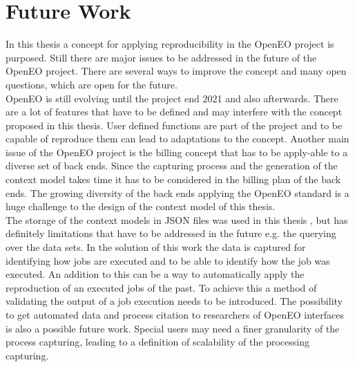 \documentclass[draft,final]{vutinfth} %
\begin{document}
\section{Future Work}
In this thesis a concept for applying reproducibility in the OpenEO project is purposed. Still there are major issues to be addressed in the future of the OpenEO project. There are several ways to improve the concept and many open questions, which are open for the future. \\
OpenEO is still evolving until the project end 2021 and also afterwards. There are a lot of features that have to be defined and may interfere with the concept proposed in this thesis. User defined functions are part of the project and to be capable of reproduce them can lead to adaptations to the concept. Another main issue of the OpenEO project is the billing concept that has to be apply-able to a diverse set of back ends. Since the capturing process and the generation of the context model takes time it has to be considered in the billing plan of the back ends. The growing diversity of the back ends applying the OpenEO standard is a huge challenge to the design of the context model of this thesis.\\
The storage of the context models in JSON files was used in this thesis , but has definitely limitations that have to be addressed in the future e.g. the querying over the data sets. 
In the solution of this work the data is captured for identifying how jobs are executed and to be able to identify how the job was executed. An addition to this can be a way to automatically apply the reproduction of an executed jobs of the past. To achieve this a method of validating the output of a job execution needs to be introduced. The possibility to get automated data and process citation to researchers of OpenEO interfaces is also a possible future work. Special users may need a finer granularity of the process capturing, leading to a definition of scalability of the processing capturing.      


\backmatter

\listoffigures %

\cleardoublepage %
\listoftables %


\printindex

\printglossaries



\end{document}
